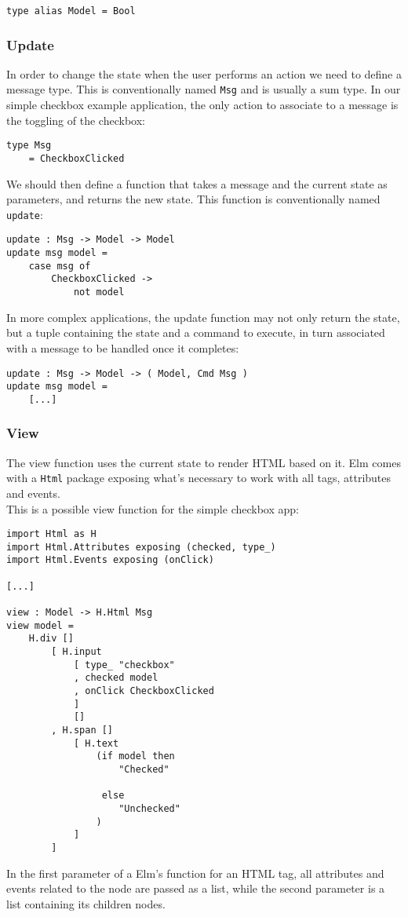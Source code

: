 \begin{verbatim}
type alias Model = Bool
\end{verbatim}

\subsubsection{Update}
In order to change the state when the user performs an action we need to define a message type. This is conventionally named \texttt{Msg} and is usually a sum type. In our simple checkbox example application, the only action to associate to a message is the toggling of the checkbox:
\begin{verbatim}
type Msg
    = CheckboxClicked
\end{verbatim}

We should then define a function that takes a message and the current state as parameters, and returns the new state. This function is conventionally named \texttt{update}:
\begin{verbatim}
update : Msg -> Model -> Model
update msg model =
    case msg of
        CheckboxClicked ->
            not model
\end{verbatim}

In more complex applications, the update function may not only return the state, but a tuple containing the state and a command to execute, in turn associated with a message to be handled once it completes:
\begin{verbatim}
update : Msg -> Model -> ( Model, Cmd Msg )
update msg model =
    [...]
\end{verbatim}

\subsubsection{View}
The view function uses the current state to render HTML based on it. Elm comes with a \texttt{Html} package exposing what's necessary to work with all tags, attributes and events.\\
This is a possible view function for the simple checkbox app:
\begin{verbatim}
import Html as H
import Html.Attributes exposing (checked, type_)
import Html.Events exposing (onClick)

[...]

view : Model -> H.Html Msg
view model =
    H.div []
        [ H.input
            [ type_ "checkbox"
            , checked model
            , onClick CheckboxClicked
            ]
            []
        , H.span []
            [ H.text
                (if model then
                    "Checked"

                 else
                    "Unchecked"
                )
            ]
        ]
\end{verbatim}
In the first parameter of a Elm's function for an HTML tag, all attributes and events related to the node are passed as a list, while the second parameter is a list containing its children nodes.\\

